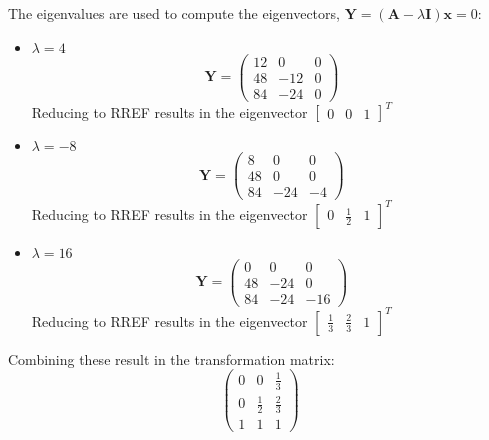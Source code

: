 The eigenvalues are used to compute the eigenvectors, $\boldsymbol{Y}=\left(\boldsymbol{A}-\lambda\boldsymbol{I}\right)\boldsymbol{x}=0$:
\begin{itemize}
	\item $\lambda=4$
	\begin{equation*}
		\boldsymbol{Y}=
		\begin{pmatrix}
			12&0&0\\48&-12&0\\84&-24&0
		\end{pmatrix}
	\end{equation*}
Reducing to RREF results in the eigenvector $\begin{bmatrix}0&0&1\end{bmatrix}^T$
\item $\lambda=-8$
	\begin{equation*}
		\boldsymbol{Y}=
		\begin{pmatrix}
			8&0&0\\48&0&0\\84&-24&-4
		\end{pmatrix}
	\end{equation*}
Reducing to RREF results in the eigenvector $\begin{bmatrix}0&\frac{1}{2}&1\end{bmatrix}^T$
\item $\lambda=16$
	\begin{equation*}
		\boldsymbol{Y}=
		\begin{pmatrix}
			0&0&0\\48&-24&0\\84&-24&-16
		\end{pmatrix}
	\end{equation*}
Reducing to RREF results in the eigenvector $\begin{bmatrix}\frac{1}{3}&\frac{2}{3}&1\end{bmatrix}^T$
\end{itemize}
Combining these result in the transformation matrix:
\begin{equation*}\boxed{
	\begin{pmatrix}
		0&0&\frac{1}{3}\\0&\frac{1}{2}&\frac{2}{3}\\1&1&1
	\end{pmatrix}}
\end{equation*}
	